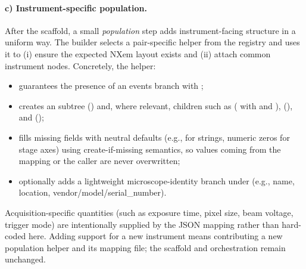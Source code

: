 \paragraph{c) Instrument-specific population.}
After the scaffold, a small \emph{population} step adds instrument-facing structure in a uniform way. The builder selects a pair-specific helper from the registry and uses it to (i) ensure the expected NXem layout exists and (ii) attach common instrument nodes. Concretely, the helper:
\begin{itemize}
	\item guarantees the presence of an events branch  with ;
	\item creates an  subtree () and, where relevant, children such as  ( with   and  ),  (), and  ();
	\item fills missing fields with neutral defaults (e.g.,  for strings, numeric zeros for stage axes) using create-if-missing semantics, so values coming from the mapping or the caller are never overwritten;
	\item optionally adds a lightweight microscope-identity branch under  (e.g., name, location, vendor/model/serial\_number).
\end{itemize}
Acquisition-specific quantities (such as exposure time, pixel size, beam voltage, trigger mode) are intentionally supplied by the JSON mapping rather than hard-coded here. Adding support for a new instrument means contributing a new population helper and its mapping file; the scaffold and orchestration remain unchanged.

